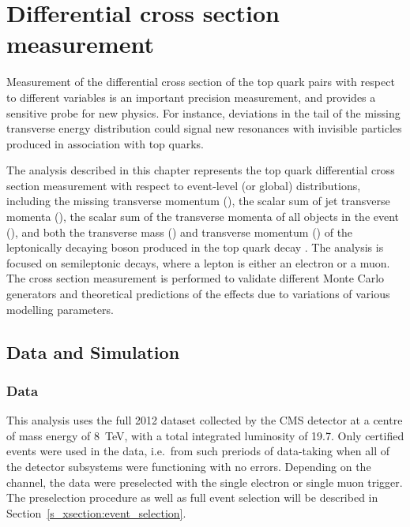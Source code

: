 
\chapter[Differential cross section measurement]{Differential cross section measurement}
\label{c:xsection_analysis}
\ifpdf
    \graphicspath{{06_Cross_section_analysis/plots/}}
\else
    \graphicspath{{06_Cross_section_analysis/plots/EPS/}{06_Cross_section_analysis/plots/}}
\fi

Measurement of the differential cross section of the top quark pairs with respect to different variables is an important
precision measurement, and provides a sensitive probe for new physics. For instance, deviations in the tail of the
missing transverse energy distribution could signal new resonances with invisible particles produced in association with
top quarks.

The analysis described in this chapter represents the top quark differential cross section measurement with respect to
event-level (or global) distributions, including the missing transverse momentum (\MET), the scalar sum of jet
transverse momenta (\HT), the scalar sum of the transverse momenta of all objects in the event (\ST), and both the
transverse mass (\MT) and transverse momentum (\WPT) of the leptonically decaying \W boson produced in the top quark
decay \autocite{xsection_PAS_7TeV, xsection_PAS_8TeV}. The analysis is focused on semileptonic \ttbar decays, where a
lepton is either an electron or a muon. The cross section measurement is performed to validate different Monte Carlo
generators and theoretical predictions of the effects due to variations of various modelling parameters.

\section{Data and Simulation}
\label{s_xsection:data_and_simulation}

\subsection{Data}
\label{ss_xsection:data}
This analysis uses the full 2012 dataset collected by the CMS detector at a centre of mass energy of \SI{8}{\TeV}, with
a total integrated luminosity of \SI{19.7}{\fbinv}. Only certified events were used in the data, i.e.\ from such
preriods of data-taking when all of the detector subsystems were functioning with no errors. Depending on the channel,
the data were preselected with the single electron or single muon trigger. The preselection procedure as well as full
event selection will be described in Section~\ref{s_xsection:event_selection}.

